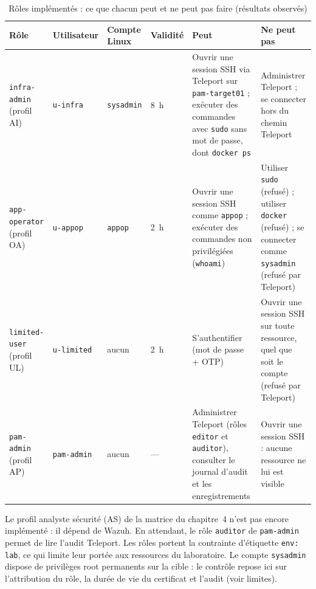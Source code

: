 \documentclass[11pt,a4paper]{report}
\begin{document}
\footnotesize\setlength{\tabcolsep}{3pt}
\begin{longtable}{@{}p{1.9cm}p{1.5cm}p{1.5cm}p{1.2cm}p{4.2cm}p{4.6cm}@{}}
\caption{Rôles implémentés : ce que chacun peut et ne peut pas faire (résultats observés)}\\
\toprule\textbf{Rôle} & \textbf{Utilisateur} & \textbf{Compte Linux} & \textbf{Validité} & \textbf{Peut} & \textbf{Ne peut pas}\\ \midrule\endhead
\texttt{infra-admin} (profil AI) & \texttt{u-infra} & \texttt{sysadmin} & 8~h & Ouvrir une session SSH via Teleport sur \texttt{pam-target01} ; exécuter des commandes avec \texttt{sudo} sans mot de passe, dont \texttt{docker ps} & Administrer Teleport ; se connecter hors du chemin Teleport\\
\texttt{app-operator} (profil OA) & \texttt{u-appop} & \texttt{appop} & 2~h & Ouvrir une session SSH comme \texttt{appop} ; exécuter des commandes non privilégiées (\texttt{whoami}) & Utiliser \texttt{sudo} (refusé) ; utiliser \texttt{docker} (refusé) ; se connecter comme \texttt{sysadmin} (refusé par Teleport)\\
\texttt{limited-user} (profil UL) & \texttt{u-limited} & aucun & 2~h & S'authentifier (mot de passe + OTP) & Ouvrir une session SSH sur toute ressource, quel que soit le compte (refusé par Teleport)\\
\texttt{pam-admin} (profil AP) & \texttt{pam-admin} & aucun & --- & Administrer Teleport (rôles \texttt{editor} et \texttt{auditor}), consulter le journal d'audit et les enregistrements & Ouvrir une session SSH : aucune ressource ne lui est visible\\
\bottomrule
\end{longtable}
\normalsize
Le profil analyste sécurité (AS) de la matrice du chapitre~4 n'est pas encore implémenté : il dépend de Wazuh. En attendant, le rôle \texttt{auditor} de \texttt{pam-admin} permet de lire l'audit Teleport. Les rôles portent la contrainte d'étiquette \texttt{env: lab}, ce qui limite leur portée aux ressources du laboratoire. Le compte \texttt{sysadmin} dispose de privilèges root permanents sur la cible : le contrôle repose ici sur l'attribution du rôle, la durée de vie du certificat et l'audit (voir limites).
\end{document}
